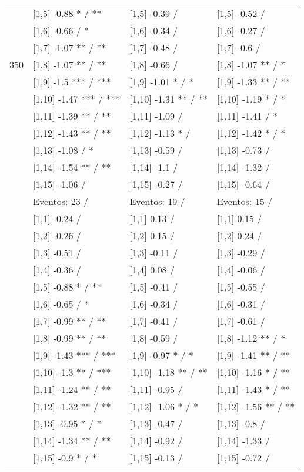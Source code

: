 \begin{table}
\begin{tabular}[t]{llll}
 & {}[1,5] -0.88 * / ** & {}[1,5] -0.39  / & {}[1,5] -0.52  /\\
 & {}[1,6] -0.66  / * & {}[1,6] -0.34  / & {}[1,6] -0.27  /\\
 & {}[1,7] -1.07 ** / ** & {}[1,7] -0.48  / & {}[1,7] -0.6  /\\
350 & {}[1,8] -1.07 ** / ** & {}[1,8] -0.66  / & {}[1,8] -1.07 ** / *\\
\addlinespace
 & {}[1,9] -1.5 *** / *** & {}[1,9] -1.01 * / * & {}[1,9] -1.33 ** / **\\
 & {}[1,10] -1.47 *** / *** & {}[1,10] -1.31 ** / ** & {}[1,10] -1.19 * / *\\
 & {}[1,11] -1.39 ** / ** & {}[1,11] -1.09  / & {}[1,11] -1.41  / *\\
 & {}[1,12] -1.43 ** / ** & {}[1,12] -1.13 * / & {}[1,12] -1.42 * / *\\
 & {}[1,13] -1.08  / * & {}[1,13] -0.59  / & {}[1,13] -0.73  /\\
\addlinespace
 & {}[1,14] -1.54 ** / ** & {}[1,14] -1.1  / & {}[1,14] -1.32  /\\
 & {}[1,15] -1.06  / & {}[1,15] -0.27  / & {}[1,15] -0.64  /\\
 & Eventos:  23 / & Eventos:  19 / & Eventos:  15 /\\
 & {}[1,1] -0.24  / & {}[1,1] 0.13  / & {}[1,1] 0.15  /\\
 & {}[1,2] -0.26  / & {}[1,2] 0.15  / & {}[1,2] 0.24  /\\
\addlinespace
 & {}[1,3] -0.51  / & {}[1,3] -0.11  / & {}[1,3] -0.29  /\\
 & {}[1,4] -0.36  / & {}[1,4] 0.08  / & {}[1,4] -0.06  /\\
 & {}[1,5] -0.88 * / ** & {}[1,5] -0.41  / & {}[1,5] -0.55  /\\
 & {}[1,6] -0.65  / * & {}[1,6] -0.34  / & {}[1,6] -0.31  /\\
 & {}[1,7] -0.99 ** / ** & {}[1,7] -0.41  / & {}[1,7] -0.61  /\\
\addlinespace
500 & {}[1,8] -0.99 ** / ** & {}[1,8] -0.59  / & {}[1,8] -1.12 ** / *\\
 & {}[1,9] -1.43 *** / *** & {}[1,9] -0.97 * / * & {}[1,9] -1.41 ** / **\\
 & {}[1,10] -1.3 ** / *** & {}[1,10] -1.18 ** / ** & {}[1,10] -1.16 * / **\\
 & {}[1,11] -1.24 ** / ** & {}[1,11] -0.95  / & {}[1,11] -1.43 * / **\\
 & {}[1,12] -1.32 ** / ** & {}[1,12] -1.06 * / * & {}[1,12] -1.56 ** / **\\
\addlinespace
 & {}[1,13] -0.95 * / * & {}[1,13] -0.47  / & {}[1,13] -0.8  /\\
 & {}[1,14] -1.34 ** / ** & {}[1,14] -0.92  / & {}[1,14] -1.33  /\\
 & {}[1,15] -0.9 * / * & {}[1,15] -0.13  / & {}[1,15] -0.72  /\\
\bottomrule
\end{tabular}
\end{table}
